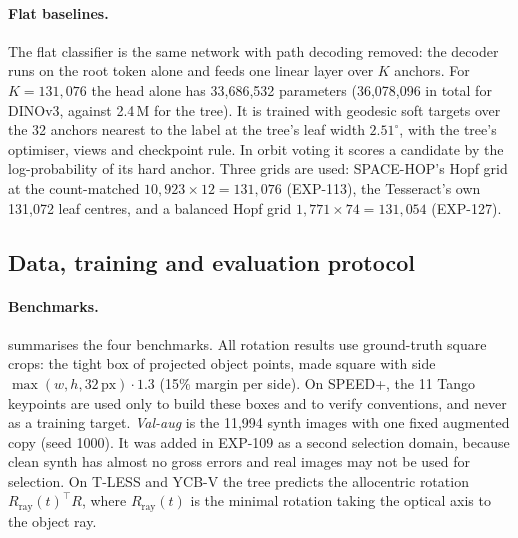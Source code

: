 \paragraph{Flat baselines.}
The flat classifier is the same network with path decoding removed: the decoder runs on the root token alone and feeds one linear layer over $K$ anchors. For $K=131{,}076$ the head alone has 33,686,532 parameters (36,078,096 in total for DINOv3, against 2.4\,M for the tree). It is trained with geodesic soft targets over the 32 anchors nearest to the label at the tree's leaf width $2.51^\circ$, with the tree's optimiser, views and checkpoint rule. In orbit voting it scores a candidate by the log-probability of its hard anchor. Three grids are used: SPACE-HOP's Hopf grid at the count-matched $10{,}923\times12=131{,}076$ (EXP-113), the Tesseract's own 131,072 leaf centres, and a balanced Hopf grid $1{,}771\times74=131{,}054$ (EXP-127).

\subsection{Data, training and evaluation protocol}\label{app:z_protocol}\label{app:protocol}

\paragraph{Benchmarks.}
 summarises the four benchmarks. All rotation results use ground-truth square crops: the tight box of projected object points, made square with side $\max(w,h,32\,\text{px})\cdot1.3$ (15\% margin per side). On SPEED+, the 11 Tango keypoints are used only to build these boxes and to verify conventions, and never as a training target. \emph{Val-aug} is the 11,994 synth images with one fixed augmented copy (seed 1000). It was added in EXP-109 as a second selection domain, because clean synth has almost no gross errors and real images may not be used for selection. On T-LESS and YCB-V the tree predicts the allocentric rotation $R_{\text{ray}}(t)^\top R$, where $R_{\text{ray}}(t)$ is the minimal rotation taking the optical axis to the object ray.

